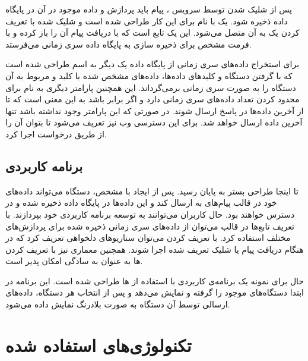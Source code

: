 پس از شلیک شدن  توسط سرویس ، پیام باید پردازش و داده موجود در آن در پایگاه داده ذخیره شود. یک  با نام  برای این کار طراحی شده‌ است و  شلیک شده با تعریف کردن یک  به آن متصل می‌شود. این  یک تابع است که با دریافت پیام آن را باز کرده و با فرمت مشخص برای ذخیره سازی به پایگاه داده سری زمانی می‌فرستد.

برای استخراج داده‌های سری زمانی از پایگاه داده یک  دیگر به اسم  طراحی شده است که با گرفتن  دستگاه و کلید‌های داده‌ها، داده‌های مشخص شده با کلید و مربوط به آن دستگاه را به صورت سری زمانی برمی‌گرداند. این  همچنین پارامتر دیگری به نام  برای محدود کردن تعداد داده‌های سری زمانی دارد و اگر برابر  باشد به این معنی است که  تا از آخرین داده‌ها در پاسخ ارسال شوند. در صورتی که این پارامتر وجود نداشته باشد تنها آخرین داده ارسال خواهد شد. برای این  دسترسی وب نیز تعریف می‌شود تا بتوان آن را از طریق درخواست  اجرا کرد.

\subsection{برنامه کاربردی}

تا اینجا طراحی بستر به پایان رسید. پس از ایجاد  با  مشخص، دستگاه می‌تواند داده‌های خود در قالب پیام‌های  به  ارسال کند و این داده‌ها در پایگاه داده ذخیره شده و در دسترس خواهند بود. حال کاربران می‌توانند به توسعه برنامه کاربردی خود بپردازند. با تعریف تابع‌ها در قالب  می‌توان از داده‌های سری زمانی ذخیره شده برای پردازش‌های مختلف استفاده کرد. با تعریف کردن  می‌توان سناریوهای دلخواهی تعریف کرد که در هنگام دریافت پیام یا شلیک  تعریف شده اجرا شوند. همچنین معماری  نیز با تعریف کردن  ها به عنوان  به سادگی امکان پذیر است.

حال برای نمونه یک برنامه‌ی کاربردی با استفاده از  ها طراحی شده است. این برنامه در ابتدا دستگاه‌های موجود را گرفته و نمایش می‌دهد و پس از انتخاب هر دستگاه، داده‌های ارسالی توسط آن دستگاه به صورت بلادرنگ نمایش داده می‌شود.

\newpage

\section{تکنولوژی‌های استفاده شده}

\subsection{}

